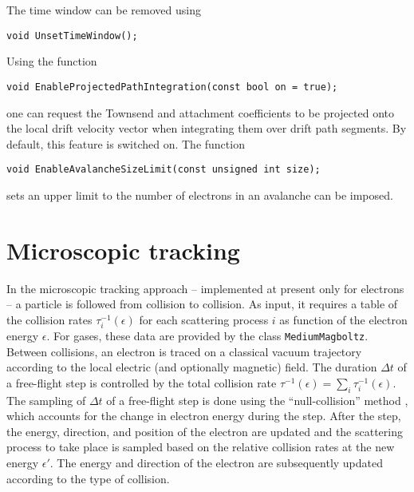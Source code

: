 The time window can be removed using
\begin{lstlisting}
void UnsetTimeWindow();
\end{lstlisting}

Using the function 
\begin{lstlisting}
void EnableProjectedPathIntegration(const bool on = true);
\end{lstlisting} 
one can request the Townsend and attachment coefficients to 
be projected onto the local drift velocity vector when integrating 
them over drift path segments.
By default, this feature is switched on.
The function 
\begin{lstlisting}
void EnableAvalancheSizeLimit(const unsigned int size);
\end{lstlisting}
sets an upper limit to the number of electrons in an avalanche 
can be imposed.

\section{Microscopic tracking}\label{Sec:MicroscopicTracking}
In the microscopic tracking approach -- implemented at present only for electrons --
a particle is followed from collision to collision. As input, it requires 
a table of the collision rates $\tau^{-1}_{i}\left(\epsilon\right)$ for each 
scattering process $i$ as function of the electron energy $\epsilon$. 
For gases, these data are provided by the class \texttt{MediumMagboltz}.
Between collisions, an electron is traced on a classical vacuum trajectory 
according to the local electric (and optionally magnetic) field. 
The duration $\Delta{t}$ of a free-flight step is controlled by the 
total collision rate 
$\tau^{-1}\left(\epsilon\right) = 
\sum_{i}\tau^{-1}_{i}\left(\epsilon\right)$.
The sampling of $\Delta{t}$ of a free-flight step is done using the 
``null-collision'' method \cite{Skullerud1968}, which accounts for 
the change in electron energy during the step. 
After the step, the energy, direction, and position of the electron 
are updated and the scattering process to take place is sampled based 
on the relative collision rates at the new energy $\epsilon'$.
The energy and direction of the electron are subsequently updated 
according to the type of collision.

